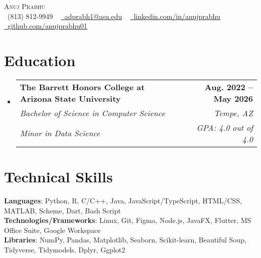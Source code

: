 \documentclass[letterpaper,11pt]{article}
\makeatletter
\newcommand{\resumeSubHeadingListStart}{\begin{itemize}[leftmargin=0.0in, label={}]}
\newcommand{\resumeSubHeadingListEnd}{\end{itemize}}
\newcommand{\resumeSubheadingEdu}[6]{
  \vspace{-2pt}\item
    \begin{tabular*}{1.0\textwidth}[t]{l@{\extracolsep{\fill}}r}
      \textbf{#1} & \textbf{\small #2} \\
      \textit{\small#3} & \textit{\small #4} \\
      \textit{\small#5} & \textit{\small #6} \\
    \end{tabular*}\vspace{-7pt}
}
\makeatother
\begin{document}

\begin{center}
    {\Huge \scshape Anuj Prabhu} \\ \vspace{1pt}
    \small \raisebox{-0.1\height}\faPhone\ (813) 812-9949 ~ \href{mailto:adprabh1@asu.edu}{\raisebox{-0.2\height}\faEnvelope\  \underline{adprabh1@asu.edu}} ~ 
    \href{https://www.linkedin.com/in/anujprabhu/}{\raisebox{-0.2\height}\faLinkedin\ \underline{linkedin.com/in/anujprabhu}}  ~
    \href{https://github.com/anujprabhu01}{\raisebox{-0.2\height}\faGithub\ \underline{github.com/anujprabhu01}} ~ {\raisebox{-0.2\height}\faFlag\ \raisebox{-0.2\height}{U.S. Citizen}}
    \vspace{-8pt}
\end{center}


\section{Education}
  \resumeSubHeadingListStart
    \resumeSubheadingEdu
    {The Barrett Honors College at Arizona State University}{Aug. 2022 -- May 2026}
      {Bachelor of Science in Computer Science}{Tempe, AZ}
      {Minor in Data Science}{GPA: 4.0 out of 4.0}
  \resumeSubHeadingListEnd

\section{Technical Skills}
 \begin{itemize}[leftmargin=0.15in, label={}]
    \small{\item{
     \textbf{Languages}{: Python, R, C/C++, Java, JavaScript/TypeScript, HTML/CSS, MATLAB, Scheme, Dart, Bash Script} \\
     \textbf{Technologies/Frameworks}{: Linux, Git, Figma, Node.js, JavaFX, Flutter, MS Office Suite, Google Workspace} \\
     \textbf{Libraries}{: NumPy, Pandas, Matplotlib, Seaborn, Scikit-learn, Beautiful Soup, Tidyverse, Tidymodels, Dplyr, Ggplot2} \\
    }}
 \end{itemize}
 \vspace{-16pt}
\end{document}
